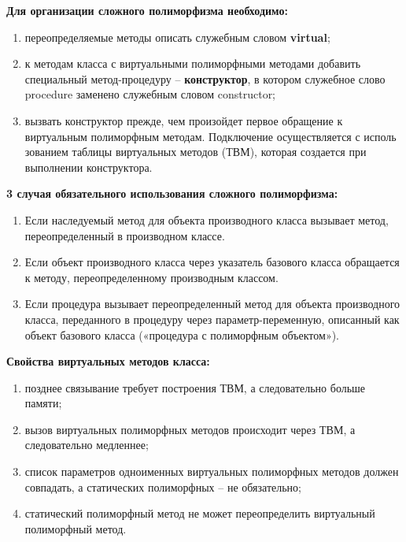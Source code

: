 {\bf{Для организации сложного полиморфизма необходимо:}}

\begin{enumerate}
\item переопределяемые методы описать служебным словом {\bf{virtual}}; 
\item к методам класса с виртуальными полиморфными методами добавить специальный метод-процедуру – {\bf{конструктор}}, в котором служебное слово procedure заменено служебным словом constructor;
\item вызвать конструктор прежде, чем произойдет первое обращение к виртуальным полиморфным методам.  
Подключение осуществляется с исполь	зованием таблицы виртуальных методов (ТВМ), которая создается при выполнении конструктора.
\end{enumerate}


{\bf{3 случая обязательного использования сложного полиморфизма:}}
\begin{enumerate}
\item Если наследуемый метод для объекта производного класса вызывает метод, переопределенный в производном классе.
\item Если объект производного класса через указатель базового класса обращается к методу, переопределенному производным классом.
\item Если процедура вызывает переопределенный метод для объекта производного класса, переданного в процедуру через параметр-переменную, описанный как объект базового класса («процедура с полиморфным объектом»). 
\end{enumerate}

{\bf{Свойства виртуальных методов класса:}}
\begin{enumerate}
    \item позднее связывание требует построения ТВМ, а следовательно больше памяти;
    \item вызов виртуальных полиморфных методов происходит через ТВМ, а следовательно медленнее;
    \item список параметров одноименных виртуальных полиморфных методов должен совпадать, а статических полиморфных – не обязательно;
    \item статический полиморфный метод не может переопределить виртуальный полиморфный метод.  
\end{enumerate}




